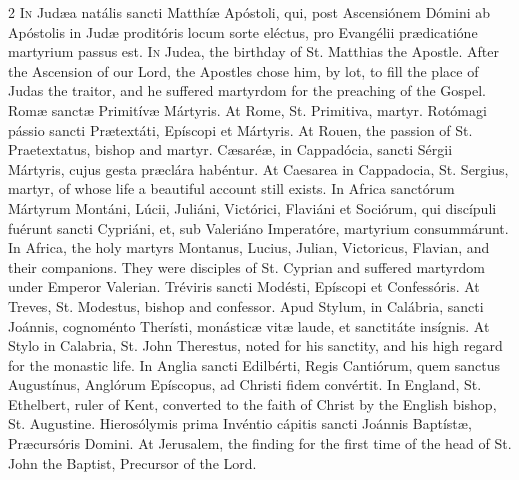 \begin{paracol}{2}
\lettrine[lines=2]{I}{n} Judæa natális sancti Matthíæ Apóstoli, qui, 
 post Ascensiónem Dómini ab Apóstolis in Judæ proditóris locum sorte eléctus, 
 pro Evangélii prædicatióne martyrium passus est.
\switchcolumn
{}
\lettrine[lines=2]{I}{n} Judea, the birthday of St. Matthias the Apostle. After the 
 Ascension of our Lord, the Apostles chose him, by lot, to fill the place of 
 Judas the traitor, and he suffered martyrdom for the preaching of the 
 Gospel.
\switchcolumn*
{}
Romæ sanctæ Primitívæ Mártyris.
\switchcolumn
{}
At Rome, St. Primitiva, martyr.
\switchcolumn*
{}
Rotómagi pássio sancti Prætextáti, Epíscopi et 
 Mártyris.
\switchcolumn
{}
At Rouen, the passion of St. Praetextatus, bishop and martyr.
\switchcolumn*
{}
Cæsaréæ, in Cappadócia, sancti Sérgii Mártyris, 
 cujus gesta præclára habéntur.
\switchcolumn
{}
At Caesarea in Cappadocia, St. Sergius, martyr, of whose life a beautiful 
 account still exists.
\switchcolumn*
{}
In Africa sanctórum Mártyrum Montáni, Lúcii, Juliáni, Victórici, 
 Flaviáni et Sociórum, qui discípuli fuérunt sancti Cypriáni, et, sub 
 Valeriáno Imperatóre, martyrium consummárunt.
\switchcolumn
{}
In Africa, the holy martyrs Montanus, Lucius, Julian, Victoricus, Flavian, 
 and their companions. They were disciples of St. Cyprian and suffered 
 martyrdom under Emperor Valerian.
\switchcolumn*
{}
Tréviris sancti Modésti, Epíscopi et 
 Confessóris.
\switchcolumn
{}
At Treves, St. Modestus, bishop and confessor.
\switchcolumn*
{}
Apud Stylum, in Calábria, sancti Joánnis, cognoménto Therísti, monásticæ 
 vitæ laude, et sanctitáte insígnis.
\switchcolumn
{}
At Stylo in Calabria, St. John Therestus, noted for his sanctity, and his 
 high regard for the monastic life.
\switchcolumn*
{}
In Anglia sancti Edilbérti, Regis Cantiórum, quem sanctus Augustínus, 
 Anglórum Epíscopus, ad Christi fidem convértit.
\switchcolumn
{}
In England, St. Ethelbert, ruler of Kent, converted to the faith of Christ 
 by the English bishop, St. Augustine.
\switchcolumn*
{}
Hierosólymis prima Invéntio cápitis sancti Joánnis Baptístæ, 
 Præcursóris Domini.
\switchcolumn
{}
At Jerusalem, the finding for the first time of the head of St. John the 
 Baptist, Precursor of the Lord.
\switchcolumn*
{}
\end{paracol}


